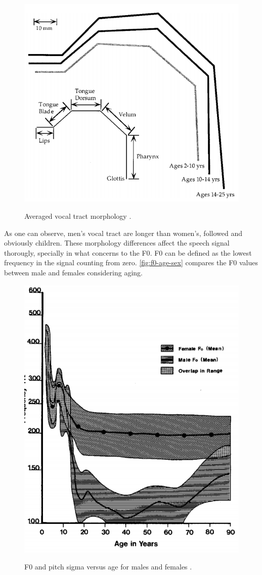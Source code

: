 \begin{figure}[H]
        \myfloatalign
        {\includegraphics[width=.66\linewidth]{gfx/vocal-tract-size-gender.png}}
        \caption{Averaged vocal tract morphology \cite{Fitch1999}.}
        \label{fig:vocal-tract-morphology}
\end{figure}

As one can observe, men's vocal tract are longer than women's, followed and obviously children. These morphology differences 
affect the speech signal thorougly, specially in what concerns to the \ac{F0}. \ac{F0} can be defined as the 
lowest frequency in the signal counting from zero. \autoref{fig:f0-age-sex} compares the \ac{F0} values
between male and females considering aging.

\begin{figure}[!h]
        \myfloatalign
        {\includegraphics[width=.66\linewidth]{gfx/f0-age-sex.png}}
        \caption{F0 and pitch sigma versus age for males and females \cite{Brown1991}.}
        \label{fig:f0-age-sex}
\end{figure}

